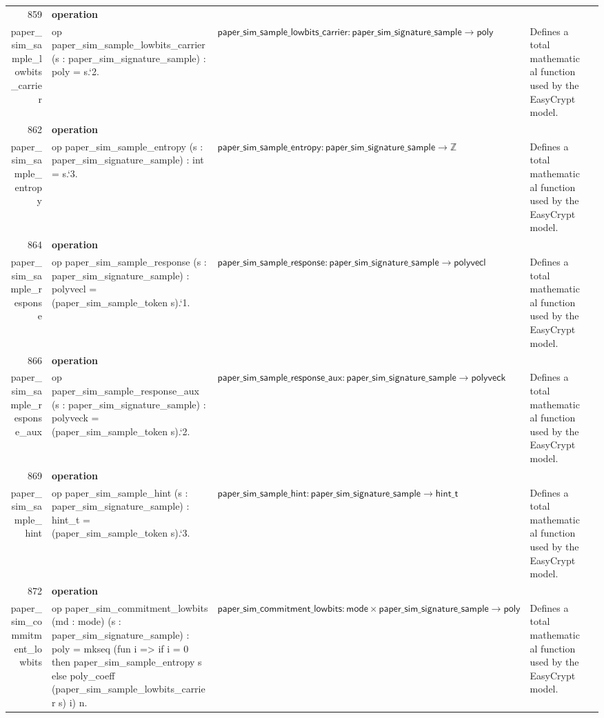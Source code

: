 \documentclass[10pt]{article}
\newcommand{\ec}[1]{\begingroup\ttfamily\scriptsize #1\endgroup}
\begin{document}
\begin{longtable}{r L{0.17\textwidth} L{0.26\textwidth} L{0.27\textwidth} L{0.20\textwidth}}
859 & \textbf{operation}\\\ec{paper\_sim\_sample\_lowbits\_carrier} & \ec{op paper\_sim\_sample\_lowbits\_carrier (s : paper\_sim\_signature\_sample) : poly = s.`2.} & \(\mathsf{paper\_sim\_sample\_lowbits\_carrier} : \mathsf{paper\_sim\_signature\_sample} \to \mathsf{poly}\) & Defines a total mathematical function used by the EasyCrypt model. \\
862 & \textbf{operation}\\\ec{paper\_sim\_sample\_entropy} & \ec{op paper\_sim\_sample\_entropy (s : paper\_sim\_signature\_sample) : int = s.`3.} & \(\mathsf{paper\_sim\_sample\_entropy} : \mathsf{paper\_sim\_signature\_sample} \to \mathbb{Z}\) & Defines a total mathematical function used by the EasyCrypt model. \\
864 & \textbf{operation}\\\ec{paper\_sim\_sample\_response} & \ec{op paper\_sim\_sample\_response (s : paper\_sim\_signature\_sample) : polyvecl = (paper\_sim\_sample\_token s).`1.} & \(\mathsf{paper\_sim\_sample\_response} : \mathsf{paper\_sim\_signature\_sample} \to \mathsf{polyvecl}\) & Defines a total mathematical function used by the EasyCrypt model. \\
866 & \textbf{operation}\\\ec{paper\_sim\_sample\_response\_aux} & \ec{op paper\_sim\_sample\_response\_aux (s : paper\_sim\_signature\_sample) : polyveck = (paper\_sim\_sample\_token s).`2.} & \(\mathsf{paper\_sim\_sample\_response\_aux} : \mathsf{paper\_sim\_signature\_sample} \to \mathsf{polyveck}\) & Defines a total mathematical function used by the EasyCrypt model. \\
869 & \textbf{operation}\\\ec{paper\_sim\_sample\_hint} & \ec{op paper\_sim\_sample\_hint (s : paper\_sim\_signature\_sample) : hint\_t = (paper\_sim\_sample\_token s).`3.} & \(\mathsf{paper\_sim\_sample\_hint} : \mathsf{paper\_sim\_signature\_sample} \to \mathsf{hint\_t}\) & Defines a total mathematical function used by the EasyCrypt model. \\
872 & \textbf{operation}\\\ec{paper\_sim\_commitment\_lowbits} & \ec{op paper\_sim\_commitment\_lowbits (md : mode) (s : paper\_sim\_signature\_sample) : poly = mkseq (fun i => if i = 0 then paper\_sim\_sample\_entropy s else poly\_coeff (paper\_sim\_sample\_lowbits\_carrier s) i) n.} & \(\mathsf{paper\_sim\_commitment\_lowbits} : \mathsf{mode} \times \mathsf{paper\_sim\_signature\_sample} \to \mathsf{poly}\) & Defines a total mathematical function used by the EasyCrypt model. \\

\end{longtable}
\end{document}
